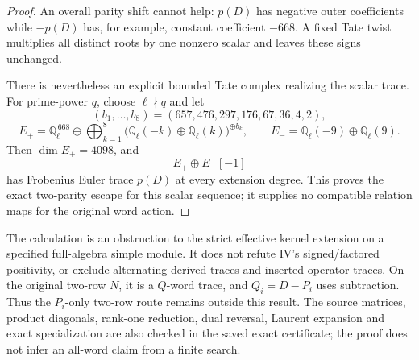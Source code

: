 \begin{proof}
An overall parity shift cannot help:
\(p(D)\) has negative outer coefficients while
\(-p(D)\) has, for example, constant coefficient \(-668\).
A fixed Tate twist multiplies all distinct roots by one
nonzero scalar and leaves these signs unchanged.

There is nevertheless an explicit bounded Tate complex
realizing the scalar trace. For prime-power \(q\), choose
\(\ell\nmid q\) and let
\[
 (b_1,\ldots,b_8)=(657,476,297,176,67,36,4,2),
\]
\[
 E_+=\mathbb Q_\ell^{\,668}
   \oplus\bigoplus_{k=1}^{8}
      \big(\mathbb Q_\ell(-k)\oplus
           \mathbb Q_\ell(k)\big)^{\oplus b_k},
 \qquad
 E_-=\mathbb Q_\ell(-9)\oplus\mathbb Q_\ell(9).
\]
Then \(\dim E_+=4098\), and
\[
 E_+\oplus E_-[-1]
\]
has Frobenius Euler trace \(p(D)\) at every extension degree.
This proves the exact two-parity escape for this scalar
sequence; it supplies no compatible relation maps for
the original word action.
\end{proof}

The calculation is an obstruction to the strict effective
kernel extension on a specified full-algebra simple module.
It does not refute IV's signed/factored positivity, or
exclude alternating derived traces and inserted-operator
traces. On the original two-row \(N\), it is a \(Q\)-word
trace, and \(Q_i=D-P_i\) uses subtraction. Thus the
\(P_i\)-only two-row route remains outside this result.
The source matrices, product diagonals, rank-one reduction,
dual reversal, Laurent expansion and exact specialization
are also checked in the saved exact certificate; the proof
does not infer an all-word claim from a finite search.

